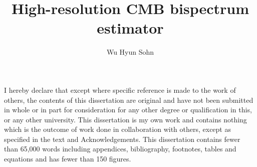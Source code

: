 \documentclass[a4paper,12pt,times,custombib,print,index]{Classes/PhDThesisPSnPDF} %
\title{High-resolution CMB bispectrum estimator}
\author{Wu Hyun Sohn}
\begin{document}
\frontmatter

\maketitle

\clearpage{}

\begin{declaration}

I hereby declare that except where specific reference is made to the work of 
others, the contents of this dissertation are original and have not been 
submitted in whole or in part for consideration for any other degree or 
qualification in this, or any other university. This dissertation is my own 
work and contains nothing which is the outcome of work done in collaboration 
with others, except as specified in the text and Acknowledgements. This 
dissertation contains fewer than 65,000 words including appendices, 
bibliography, footnotes, tables and equations and has fewer than 150 figures.



\end{declaration}

\clearpage{}
\clearpage{}
\end{document}
